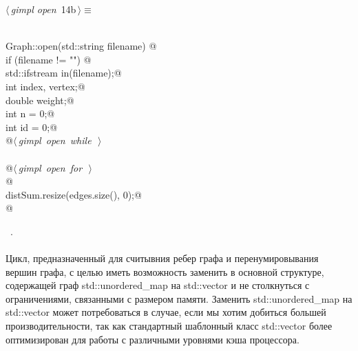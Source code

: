 \documentclass[12pt]{article}
\begin{document}
\begin{flushleft} \small
\begin{minipage}{\linewidth}\label{scrap23}\raggedright\small
{} $\langle\,${\itshape gimpl open}\nobreak\ {\footnotesize {14b}}$\,\rangle\equiv$
\vspace{-1ex}
\begin{list}{}{} \item
\mbox{}\verb@@\\
\mbox{}\verb@void Graph::open(std::string filename) {@\\
\mbox{}\verb@    if (filename != "") {@\\
\mbox{}\verb@        std::ifstream in(filename);@\\
\mbox{}\verb@        int index, vertex;@\\
\mbox{}\verb@        double weight;@\\
\mbox{}\verb@        int n = 0;@\\
\mbox{}\verb@        int id = 0;@\\
\mbox{}\verb@        @\hbox{$\langle\,${\itshape gimpl open while}\nobreak\ {\footnotesize {}}$\,\rangle$}\verb@@\\
\mbox{}\verb@@\\
\mbox{}\verb@        @\hbox{$\langle\,${\itshape gimpl open for}\nobreak\ {\footnotesize {}}$\,\rangle$}\verb@@\\
\mbox{}\verb@    }@\\
\mbox{}\verb@    distSum.resize(edges.size(), 0);@\\
\mbox{}\verb@} @\\
\mbox{}\verb@@{\NWsep}
\end{list}
\vspace{-1.5ex}
\footnotesize
\begin{list}{}{\setlength{\itemsep}{-\parsep}\setlength{\itemindent}{-\leftmargin}}
\item \NWtxtMacroRefIn\ .

\item{}
\end{list}
\end{minipage}\vspace{4ex}
\end{flushleft}
\paragraph{}
Цикл, предназначенный для считывния ребер графа и перенумировывания вершин графа, 
с целью иметь возможность заменить в основной структуре, содержащей граф std::unordered\_map на std::vector
и не столкнуться с ограничениями, связанными с размером памяти. Заменить std::unordered\_map на std::vector может
потребоваться в случае, если мы хотим добиться большей производительности, так как стандартный шаблонный класс
std::vector более оптимизирован для работы с различными уровнями кэша процессора.
\end{document}
